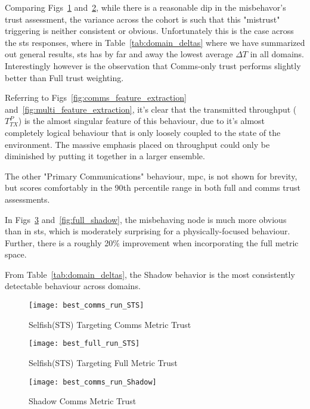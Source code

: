 Comparing Figs~\ref{fig:comms_sts} and~\ref{fig:full_sts}, while there is a reasonable dip in the misbehavor's trust assessment, the variance across the cohort is such that this "mistrust" triggering is neither consistent or obvious. Unfortunately this is the case across the \gls{sts} responses, where in Table~\ref{tab:domain_deltas} where we have summarized out general results, \gls{sts} has by far and away the lowest average $\Delta T$ in all domains. Interestingly however is the observation that Comms-only trust performs slightly better than Full trust weighting.

Referring to Figs~\ref{fig:comms_feature_extraction} and~\autoref{fig:multi_feature_extraction}, it's clear that the transmitted throughput ($T^P_{TX}$) is the almost singular feature of this behaviour, due to it's almost completely logical behaviour that is only loosely coupled to the state of the environment. 
The massive emphasis placed on throughput could only be diminished by putting it together in a larger ensemble.

The other "Primary Communications" behaviour, \gls{mpc}, is not shown for brevity, but scores comfortably in the 90th percentile range in both full and comms trust assessments.

In Figs~\ref{fig:comms_shadow} and~\ref{fig:full_shadow}, the misbehaving node is much more obvious than in \gls{sts}, which is moderately surprising for a physically-focused behaviour. Further, there is a roughly 20\% improvement when incorporating the full metric space.

From Table~\ref{tab:domain_deltas}, the Shadow behavior is the most consistently detectable behaviour across domains. 

\begin{figure}[h]
	\centering
	\texttt{[image: best\_comms\_run\_STS]}
	\caption{Selfish(STS) Targeting Comms Metric Trust}
	\label{fig:comms_sts}
\end{figure}

\begin{figure}[h]
	\centering
	\texttt{[image: best\_full\_run\_STS]}
	\caption{Selfish(STS) Targeting Full Metric Trust}
	\label{fig:full_sts}
\end{figure}

\begin{figure}[h]
	\centering
	\texttt{[image: best\_comms\_run\_Shadow]}
	\caption{Shadow Comms Metric Trust}
	\label{fig:comms_shadow}
\end{figure}

